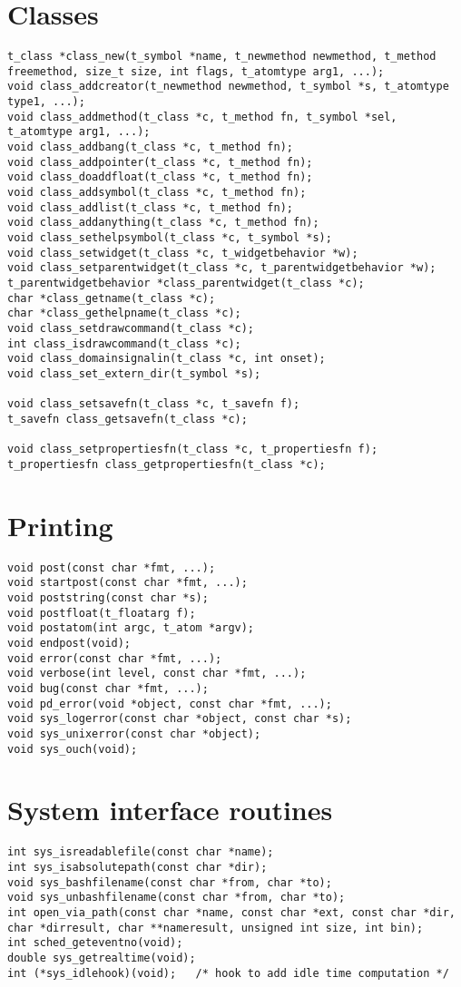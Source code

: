 \section{Classes}
\begin{lstlisting}
t_class *class_new(t_symbol *name, t_newmethod newmethod, t_method freemethod, size_t size, int flags, t_atomtype arg1, ...);
void class_addcreator(t_newmethod newmethod, t_symbol *s, t_atomtype type1, ...);
void class_addmethod(t_class *c, t_method fn, t_symbol *sel, t_atomtype arg1, ...);
void class_addbang(t_class *c, t_method fn);
void class_addpointer(t_class *c, t_method fn);
void class_doaddfloat(t_class *c, t_method fn);
void class_addsymbol(t_class *c, t_method fn);
void class_addlist(t_class *c, t_method fn);
void class_addanything(t_class *c, t_method fn);
void class_sethelpsymbol(t_class *c, t_symbol *s);
void class_setwidget(t_class *c, t_widgetbehavior *w);
void class_setparentwidget(t_class *c, t_parentwidgetbehavior *w);
t_parentwidgetbehavior *class_parentwidget(t_class *c);
char *class_getname(t_class *c);
char *class_gethelpname(t_class *c);
void class_setdrawcommand(t_class *c);
int class_isdrawcommand(t_class *c);
void class_domainsignalin(t_class *c, int onset);
void class_set_extern_dir(t_symbol *s);

void class_setsavefn(t_class *c, t_savefn f);
t_savefn class_getsavefn(t_class *c);

void class_setpropertiesfn(t_class *c, t_propertiesfn f);
t_propertiesfn class_getpropertiesfn(t_class *c);

\end{lstlisting}

\section{Printing}
\begin{lstlisting}
void post(const char *fmt, ...);
void startpost(const char *fmt, ...);
void poststring(const char *s);
void postfloat(t_floatarg f);
void postatom(int argc, t_atom *argv);
void endpost(void);
void error(const char *fmt, ...);
void verbose(int level, const char *fmt, ...);
void bug(const char *fmt, ...);
void pd_error(void *object, const char *fmt, ...);
void sys_logerror(const char *object, const char *s);
void sys_unixerror(const char *object);
void sys_ouch(void);
\end{lstlisting}

\section{System interface routines}
\begin{lstlisting}
int sys_isreadablefile(const char *name);
int sys_isabsolutepath(const char *dir);
void sys_bashfilename(const char *from, char *to);
void sys_unbashfilename(const char *from, char *to);
int open_via_path(const char *name, const char *ext, const char *dir, char *dirresult, char **nameresult, unsigned int size, int bin);
int sched_geteventno(void);
double sys_getrealtime(void);
int (*sys_idlehook)(void);   /* hook to add idle time computation */
\end{lstlisting}

